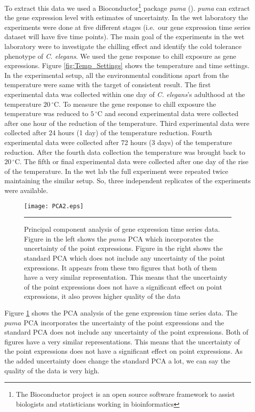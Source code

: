 To extract this data we used a Bioconductor\footnote{The Bioconductor project is an open source software framework to assist biologists and statisticians working in bioinformatics} package \textit{puma} (\cite{puma}). \textit{puma} can extract the gene expression level with estimates of uncertainty. In the wet laboratory the experiments were done at five different stages (i.e.\ our gene expression time series dataset will have five time points). The main goal of the experiments in the wet laboratory were to investigate the chilling effect and identify the cold tolerance phenotype of \textit{C. elegans}. We used the gene response to chill exposure as gene expressions. Figure \ref{fig:Temp_Settings} shows the temperature and time settings. In the experimental setup, all the environmental conditions apart from the temperature were same with the target of consistent result. The first experimental data was collected within one day of \textit{C. elegans}'s adulthood at the temperature $20\,^{\circ}\mathrm{C}$. To measure the gene response to chill exposure the temperature was reduced to $5\,^{\circ}\mathrm{C}$ and second experimental data were collected after one hour of the reduction of the temperature. Third experimental data were collected after 24 hours (1 day) of the temperature reduction.  Fourth experimental data were collected after 72 hours (3 days) of the temperature reduction. After the fourth data collection the temperature was brought back to  $20\,^{\circ}\mathrm{C}$. The fifth or final experimental data were collected after one day of the rise of the temperature. In the wet lab the full experiment were repeated twice maintaining the similar setup. So, three independent replicates of the  experiments were available. 

\begin{figure}
	\centering
		\texttt{[image: PCA2.eps]}
		\rule{35em}{0.5pt}
	\caption[Principal component analysis of gene expression time series data ]
		{Principal component analysis of gene expression time series data. Figure in the left shows the $puma$ PCA which incorporates the uncertainty of the point  expressions. Figure in the right shows the standard PCA which does not include any uncertainty of the point  expressions. It appears from these two figures that both of them have a very similar representation. This means that the uncertainty of the point expressions does not have a significant effect on point expressions, it also proves higher quality of the data}
	\label{fig:PCA_time_series}
\end{figure}
Figure \ref{fig:PCA_time_series} shows the PCA analysis of the gene expression time series data. The $puma$ PCA incorporates the uncertainty of the point expressions and the standard PCA does not include any uncertainty of the point expressions. Both of figures have a very similar representations. This means that the uncertainty of the point expressions does not have a significant effect on point expressions. As the added uncertainty does change the standard PCA a lot, we can say the quality of the data is very high.


